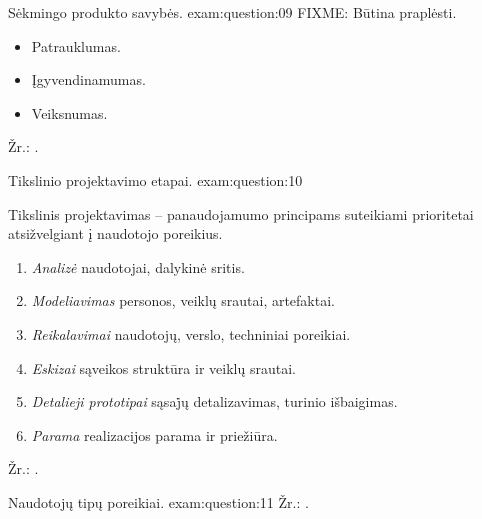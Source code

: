 \begin{question}{%
  Sėkmingo produkto savybės.
  }{exam:question:09}
  FIXME: Būtina praplėsti.
  \begin{itemize}
    \item Patrauklumas.
    \item Įgyvendinamumas.
    \item Veiksnumas.
  \end{itemize}
  Žr.: \cite[5]{skaidres-5}.
\end{question}

\begin{question}{%
  Tikslinio projektavimo etapai.
  }{exam:question:10}

  Tikslinis projektavimas\cite[54]{skaidres-5} – panaudojamumo principams
  suteikiami prioritetai atsižvelgiant į naudotojo poreikius.

  \begin{enumerate}
    \item \emph{Analizė} naudotojai, dalykinė sritis.
    \item \emph{Modeliavimas} personos, veiklų srautai, artefaktai.
    \item \emph{Reikalavimai} naudotojų, verslo, techniniai poreikiai.
    \item \emph{Eskizai} sąveikos struktūra ir veiklų srautai.
    \item \emph{Detalieji prototipai} sąsaj̇ų detalizavimas, turinio
      išbaigimas.
    \item \emph{Parama} realizacijos parama ir priežiūra.
  \end{enumerate}
  Žr.: \cite[6]{skaidres-5}.
\end{question}

\begin{question}{%
  Naudotojų tipų poreikiai.
  }{exam:question:11}
  Žr.: \cite[11--]{skaidres-5}.
\end{question}

